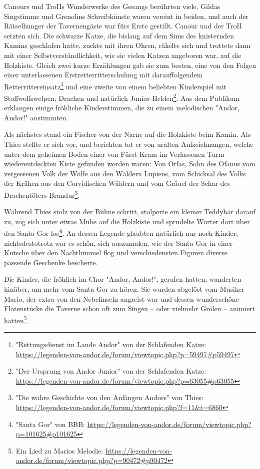 Canours und TroIIs Wunderwerke des Gesangs berührten viele. Gildas Singstimme und Grenolins Schreibkünste waren vereint in beiden, und auch der Rätselhunger der Tavernengäste war fürs Erste gestillt. Canour und der TroII setzten sich. Die schwarze Katze, die bislang auf dem Sims des knisternden Kamins geschlafen hatte, zuckte mit ihren Ohren, räkelte sich und trottete dann mit einer Selbstverständlichkeit, wie sie vielen Katzen angeboren war, auf die Holzkiste. Gleich zwei kurze Erzählungen gab sie zum besten, eine von den Folgen einer unterlassenen Erstretterritterschulung mit darauffolgendem Retterrittereinsatz\footnote{"Rettungsdienst im Lande Andor" von der Schlafenden Katze: \url{https://legenden-von-andor.de/forum/viewtopic.php?p=59497\#p59497}} und eine zweite von einem beliebten Kinderspiel mit Stoffwolfswelpen, Drachen und natürlich Junior-Helden\footnote{"Der Ursprung von Andor Junior" von der Schlafenden Katze: \url{https://legenden-von-andor.de/forum/viewtopic.php?p=63055\#p63055}}. Aus dem Publikum erklangen einige fröhliche Kinderstimmen, die zu einem melodischen "Andor, Andor!" anstimmten.

Als nächstes stand ein Fischer von der Narne auf die Holzkiste beim Kamin. Als Thies stellte er sich vor, und berichten tat er von uralten Aufzeichnungen, welche unter dem geheimen Boden einer von Fürst Kram im Verlassenen Turm wiederentdeckten Kiste gefunden worden waren: Von Orfas, Sohn des Ofanus vom vergessenen Volk der Wölfe aus den Wäldern Lupiens, vom Schicksal des Volks der Krähen aus den Corvidischen Wäldern und vom Gräuel der Schar des Drachentöters Brandur\footnote{"Die wahre Geschichte von den Anfängen Andors" von Thies: \url{https://legenden-von-andor.de/forum/viewtopic.php?f=11&t=6860}}.

Während Thies stolz von der Bühne schritt, stolperte ein kleiner Teddybär darauf zu, zog sich unter etwas Mühe auf die Holzkiste und sprudelte Wörter dort über den Santa Gor los\footnote{"Santa Gor" von BBB: \url{https://legenden-von-andor.de/forum/viewtopic.php?p=101625\#p101625}}. An dessen Legende glaubten natürlich nur noch Kinder, nichtsdestotrotz war es schön, sich auszumalen, wie der Santa Gor in einer Kutsche über den Nachthimmel flog und verschiedensten Figuren diverse passende Geschenke bescherte.

Die Kinder, die fröhlich im Chor "Andor, Andor!", gerufen hatten, wanderten hinüber, um mehr vom Santa Gor zu hören. Sie wurden abgelöst vom Musiker Mario, der extra von den Nebelinseln angreist war und dessen wunderschöne Flötenstücke die Taverne schon oft zum Singen -- oder vielmehr Grölen -- animiert hatten\footnote{Ein Lied zu Marios Melodie: \url{https://legenden-von-andor.de/forum/viewtopic.php?p=90472\#p90472}}.

